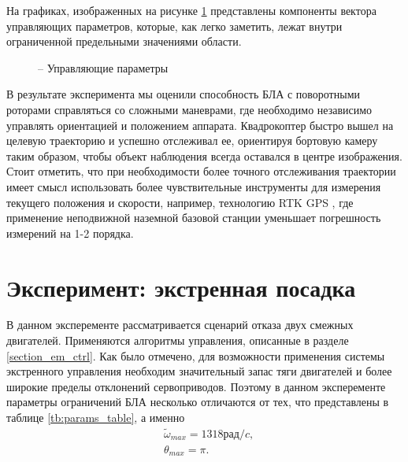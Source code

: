 На графиках, изображенных на рисунке \ref{fig:mau_ctrl_out} представлены компоненты вектора управляющих параметров, которые, как легко заметить, лежат внутри ограниченной предельными значениями области.

\begin{figure}[H]
	\centering
	
	\caption{ -- Управляющие параметры}
	\label{fig:mau_ctrl_out}
	
\end{figure}


В результате эксперимента мы оценили способность БЛА с поворотными роторами справляться со сложными маневрами, где необходимо независимо управлять ориентацией и положением аппарата. Квадрокоптер быстро вышел на целевую траекторию и успешно отслеживал ее, ориентируя бортовую камеру таким образом, чтобы объект наблюдения всегда оставался в центре изображения.
Стоит отметить, что при необходимости более точного отслеживания траектории имеет смысл использовать более чувствительные инструменты для измерения текущего положения и скорости, например, технологию RTK GPS \cite{Feng01}, где применение неподвижной наземной базовой станции уменьшает погрешность измерений на 1-2 порядка.


\section{Эксперимент: экстренная посадка}

В данном эксперементе рассматривается сценарий отказа двух смежных двигателей. Применяются алгоритмы управления, описанные в разделе \ref{section_em_ctrl}. Как было отмечено, для возможности применения системы экстренного управления необходим значительный запас тяги двигателей и более широкие пределы отклонений сервоприводов. Поэтому в данном эксперементе параметры ограничений БЛА несколько отличаются от тех, что представлены в таблице \ref{tb:params_table}, а именно
\begin{equation}
\begin{aligned}
&\tilde{\omega}_{max} = 1318 рад/c,
\\
&\theta_{max} = \pi.
\end{aligned}
\end{equation}

